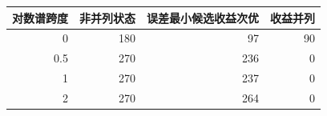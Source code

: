 \begin{tabular}{rrrr}
\toprule
对数谱跨度 & 非并列状态 & 误差最小候选收益次优 & 收益并列 \\ \midrule
0 & 180 & 97 & 90 \\
0.5 & 270 & 236 & 0 \\
1 & 270 & 237 & 0 \\
2 & 270 & 264 & 0 \\
\bottomrule
\end{tabular}
